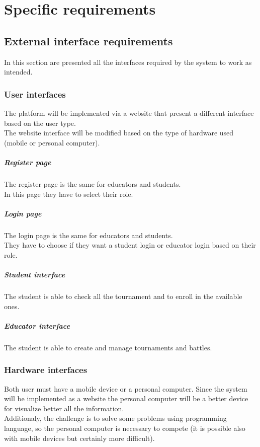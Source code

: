 \documentclass[12pt, a4paper]{report}
\begin{document}
\newpage 

\chapter{Specific requirements}
    \section{External interface requirements}
        In this section are presented all the interfaces required by the system to work as intended. 

        \subsection{User interfaces}
        The platform will be implemented via a website that present a different interface based on the user type. \\
        The website interface will be modified based on the type of hardware used (mobile or personal computer). 

        \paragraph*{Register page} 
        The register page is the same for educators and students. \\
        In this page they have to select their role. 

        \paragraph*{Login page} 
        The login page is the same for educators and students. \\
        They have to choose if they want a student login or educator login based on their role. 

        \paragraph*{Student interface} 
        The student is able to check all the tournament and to enroll in the available ones. 

        \paragraph*{Educator interface} 
        The student is able to create and manage tournaments and battles. 


        \subsection{Hardware interfaces}
        Both user must have a mobile device or a personal computer. 
        Since the system will be implemented as a website the personal computer will be a better device for visualize better all the information. \\
        Additionaly, the challenge is to solve some problems using programming language, so the personal computer is necessary to compete (it is possible also with mobile devices but certainly more difficult). 
\end{document}
